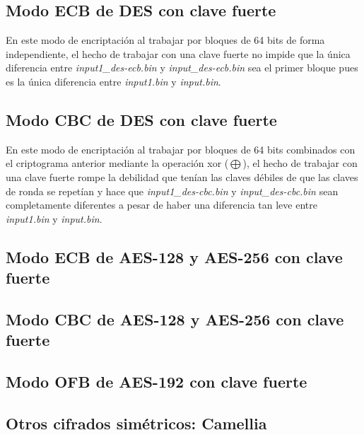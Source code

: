 \documentclass[a4paper, 11pt]{article}
\begin{document}
	\subsection{Modo ECB de DES con clave fuerte}
		En este modo de encriptación al trabajar por bloques de 64 bits de forma independiente, el hecho de trabajar con
		una clave fuerte no impide que la única diferencia entre \textit{input1\_des-ecb.bin} y \textit{input\_des-ecb.bin}
		sea el primer bloque pues es la única diferencia entre \textit{input1.bin} y \textit{input.bin}.
		
	\subsection{Modo CBC de DES con clave fuerte}
		En este modo de encriptación al trabajar por bloques de 64 bits combinados con el criptograma anterior mediante
		la operación xor ($\bigoplus$), el hecho de trabajar con una clave fuerte rompe la debilidad que tenían las claves
		débiles de que las claves de ronda se repetían y hace que \textit{input1\_des-cbc.bin} y \textit{input\_des-cbc.bin}
		sean completamente diferentes a pesar de haber una diferencia tan leve entre \textit{input1.bin} y \textit{input.bin}.
		
	\subsection{Modo ECB de AES-128 y AES-256 con clave fuerte}
		
		
	\subsection{Modo CBC de AES-128 y AES-256 con clave fuerte}
		
		
	\subsection{Modo OFB de AES-192 con clave fuerte}
		
		
	\subsection{Otros cifrados simétricos: Camellia}
		
	
\end{document}
